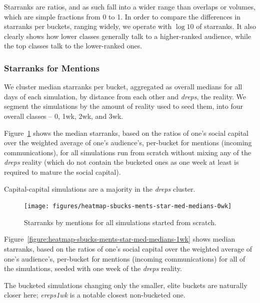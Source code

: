 \documentclass[10pt,oneside]{memoir}
\begin{document}
\begin{Spacing}{2}
Starranks are ratios, and as such fall into a wider range than overlaps or volumes, which are simple fractions from 0 to 1.  In order to compare the differences in starranks per buckets, ranging widely, we operate with $\log10$ of starranks.  It also clearly shows how lower classes generally talk to a higher-ranked audience, while the top classes talk to the lower-ranked ones.


\pagebreak \subsubsection{Starranks for Mentions}
\label{starranksformentions}

We cluster median starranks per bucket, aggregated as overall medians for all days of each simulation, by distance from each other and {\itshape dreps}, the reality.  We segment the simulations by the amount of reality used to seed them, into four overall classes -- 0, 1wk, 2wk, and 3wk.


Figure~\ref{figure:heatmap-sbucks-ments-star-med-medians-0wk} shows the median starranks, based on the ratios of one's social capital over the weighted average of one's audience's, per-bucket for mentions (incoming communications), for all simulations run from scratch without mixing any of the {\itshape dreps} reality (which do not contain the bucketed ones as one week at least is required to mature the social capital).


Capital-capital simulations are a majority in the {\itshape dreps} cluster.



\begin{figure}
\begin{center}
    \texttt{[image: figures/heatmap-sbucks-ments-star-med-medians-0wk]}
    \caption{Starranks by mentions for all simulations started from scratch.}
    \label{figure:heatmap-sbucks-ments-star-med-medians-0wk}
\end{center}
\end{figure}
Figure~\ref{figure:heatmap-sbucks-ments-star-med-medians-1wk} shows median starranks, based on the ratios of one's social capital over the weighted average of one's audience's, per-bucket for mentions (incoming communications) for all of the simulations, seeded with one week of the {\itshape dreps} reality.


The bucketed simulations changing only the smaller, elite buckets are naturally closer here; {\itshape ereps1wk} is a notable closest non-bucketed one.



\end{Spacing}
\end{document}
